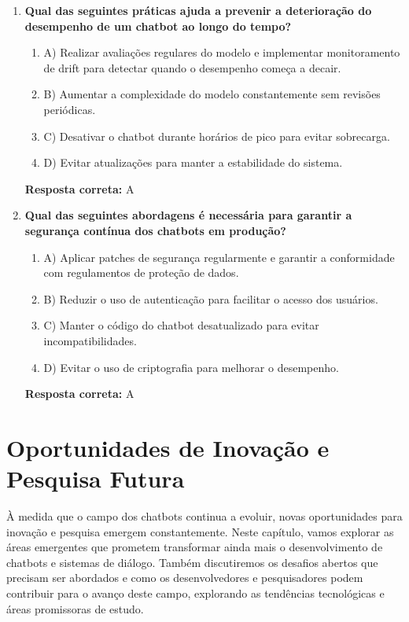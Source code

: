 \documentclass[14pt,a4paper,oneside]{book}
\begin{document}
\begin{enumerate}
	\item \textbf{Qual das seguintes práticas ajuda a prevenir a deterioração do desempenho de um chatbot ao longo do tempo?}
	\begin{enumerate}[label=\alph*)]
		\item A) Realizar avaliações regulares do modelo e implementar monitoramento de drift para detectar quando o desempenho começa a decair.
		\item B) Aumentar a complexidade do modelo constantemente sem revisões periódicas.
		\item C) Desativar o chatbot durante horários de pico para evitar sobrecarga.
		\item D) Evitar atualizações para manter a estabilidade do sistema.
	\end{enumerate}
	\vspace{5mm}
	\textbf{Resposta correta:} A
	
	\item \textbf{Qual das seguintes abordagens é necessária para garantir a segurança contínua dos chatbots em produção?}
	\begin{enumerate}[label=\alph*)]
		\item A) Aplicar patches de segurança regularmente e garantir a conformidade com regulamentos de proteção de dados.
		\item B) Reduzir o uso de autenticação para facilitar o acesso dos usuários.
		\item C) Manter o código do chatbot desatualizado para evitar incompatibilidades.
		\item D) Evitar o uso de criptografia para melhorar o desempenho.
	\end{enumerate}
	\vspace{5mm}
	\textbf{Resposta correta:} A
	
\end{enumerate}


\chapter{Oportunidades de Inovação e Pesquisa Futura}

À medida que o campo dos chatbots continua a evoluir, novas oportunidades para inovação e pesquisa emergem constantemente. Neste capítulo, vamos explorar as áreas emergentes que prometem transformar ainda mais o desenvolvimento de chatbots e sistemas de diálogo. Também discutiremos os desafios abertos que precisam ser abordados e como os desenvolvedores e pesquisadores podem contribuir para o avanço deste campo, explorando as tendências tecnológicas e áreas promissoras de estudo.
\end{document}
